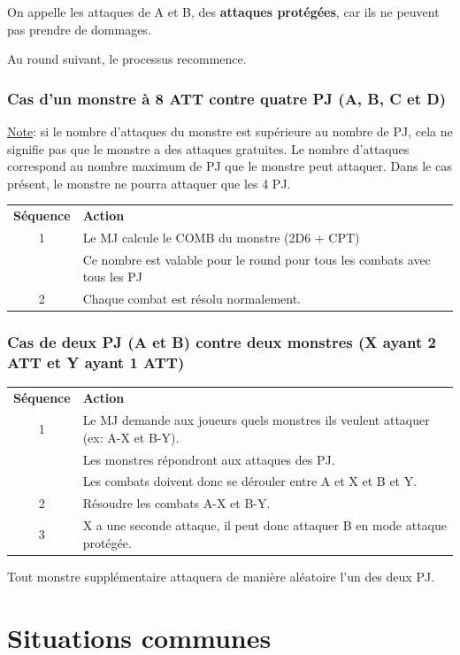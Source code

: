 \documentclass[a4paper, 11pt, twoside]{article}
\begin{document}
On appelle les attaques de A et B, des \textbf{attaques protégées}, car ils ne peuvent pas prendre de dommages.

Au round suivant, le processus recommence.

\subsubsection{Cas d'un monstre à 8 ATT contre quatre PJ (A, B, C et D)}
\label{sec:org0f04ec3}

\uline{Note}: si le nombre d'attaques du monstre est supérieure au nombre de PJ, cela ne signifie pas que le monstre a des attaques gratuites. Le nombre d'attaques correspond au nombre maximum de PJ que le monstre peut attaquer. Dans le cas présent, le monstre ne pourra attaquer que les 4 PJ.

\begin{longtable}{cl}
\textbf{Séquence} & \textbf{Action}\\
1 & Le MJ calcule le COMB du monstre (2D6 + CPT)\\
 & Ce nombre  est valable pour le round pour tous les combats avec tous les PJ\\
2 & Chaque combat est résolu normalement.\\
\end{longtable}


\subsubsection{Cas de deux PJ (A et B) contre deux monstres (X ayant 2 ATT et Y ayant 1 ATT)}
\label{sec:org9cbefec}

\begin{longtable}{cl}
\textbf{Séquence} & \textbf{Action}\\
1 & Le MJ demande aux joueurs quels monstres ils veulent attaquer (ex: A-X et B-Y).\\
 & Les monstres répondront aux attaques des PJ.\\
 & Les combats doivent donc se dérouler entre A et X et B et Y.\\
2 & Résoudre les combats A-X et B-Y.\\
3 & X a une seconde attaque, il peut donc attaquer B en mode attaque protégée.\\
\end{longtable}

Tout monstre supplémentaire attaquera de manière aléatoire l'un des deux PJ.

\section{Situations communes}
\label{sec:org6971969}
\end{document}
